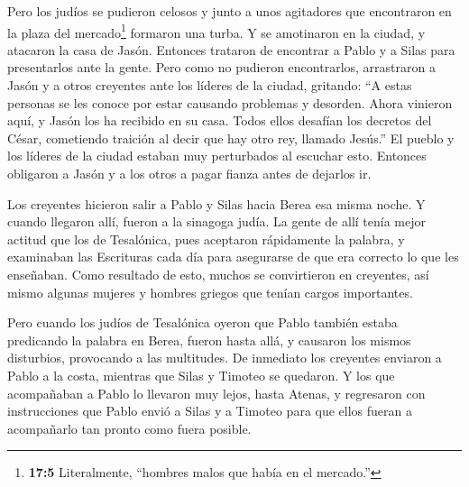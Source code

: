  Pero los judíos se pudieron celosos y junto a unos
agitadores que encontraron en la plaza del mercado\footnote{\textbf{17:5}
  Literalmente, ``hombres malos que había en el mercado.''} formaron una
turba. Y se amotinaron en la ciudad, y atacaron la casa de Jasón.
Entonces trataron de encontrar a Pablo y a Silas para presentarlos ante
la gente.  Pero como no pudieron encontrarlos, arrastraron a
Jasón y a otros creyentes ante los líderes de la ciudad, gritando: ``A
estas personas se les conoce por estar causando problemas y desorden.
Ahora vinieron aquí,  y Jasón los ha recibido en su casa.
Todos ellos desafían los decretos del César, cometiendo traición al
decir que hay otro rey, llamado Jesús.''  El pueblo y los
líderes de la ciudad estaban muy perturbados al escuchar esto.
 Entonces obligaron a Jasón y a los otros a pagar fianza
antes de dejarlos ir.

 Los creyentes hicieron salir a Pablo y Silas hacia Berea
esa misma noche. Y cuando llegaron allí, fueron a la sinagoga judía.
 La gente de allí tenía mejor actitud que los de
Tesalónica, pues aceptaron rápidamente la palabra, y examinaban las
Escrituras cada día para asegurarse de que era correcto lo que les
enseñaban.  Como resultado de esto, muchos se convirtieron
en creyentes, así mismo algunas mujeres y hombres griegos que tenían
cargos importantes.

 Pero cuando los judíos de Tesalónica oyeron que Pablo
también estaba predicando la palabra en Berea, fueron hasta allá, y
causaron los mismos disturbios, provocando a las multitudes.
 De inmediato los creyentes enviaron a Pablo a la costa,
mientras que Silas y Timoteo se quedaron.  Y los que
acompañaban a Pablo lo llevaron muy lejos, hasta Atenas, y regresaron
con instrucciones que Pablo envió a Silas y a Timoteo para que ellos
fueran a acompañarlo tan pronto como fuera posible.

